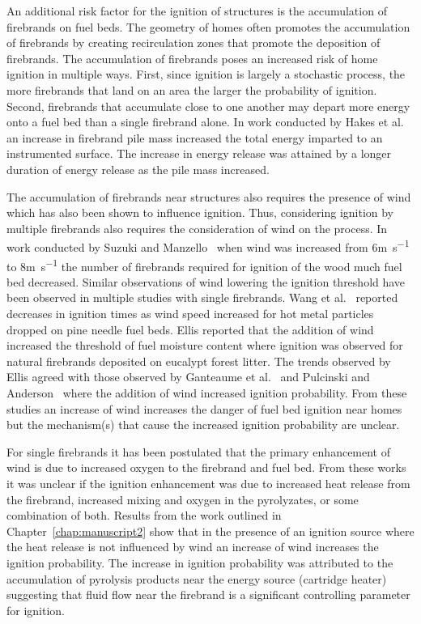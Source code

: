     An additional risk factor for the ignition of structures is the accumulation of firebrands on fuel beds. The geometry of homes often promotes the accumulation of firebrands by creating recirculation zones that promote the deposition of firebrands. The accumulation of firebrands poses an increased risk of home ignition in multiple ways. First, since ignition is largely a stochastic process, the more firebrands that land on an area the larger the probability of ignition. Second, firebrands that accumulate close to one another may depart more energy onto a fuel bed than a single firebrand alone. In work conducted by Hakes et al.~\cite{Hakes2019a} an increase in firebrand pile mass increased the total energy imparted to an instrumented surface. The increase in energy release was attained by a longer duration of energy release as the pile mass increased.
    
    The accumulation of firebrands near structures also requires the presence of wind which has also been shown to influence ignition. Thus, considering ignition by multiple firebrands also requires the consideration of wind on the process. In work conducted by Suzuki and Manzello~\cite{Suzuki2020a} when wind was increased from 6\si{\meter\per\second} to 8\si{\meter\per\second} the number of firebrands required for ignition of the wood much fuel bed decreased. Similar observations of wind lowering the ignition threshold have been observed in multiple studies with single firebrands. Wang et al.~\cite{Wang2017} reported decreases in ignition times as wind speed increased for hot metal particles dropped on pine needle fuel beds. Ellis reported that the addition of wind increased the threshold of fuel moisture content where ignition was observed for natural firebrands  deposited on eucalypt forest litter. The trends observed by Ellis agreed with those observed by Ganteaume et al.~\cite{Ganteaume2009} and Pulcinski and Anderson~\cite{Plucinski2008} where the addition of wind increased ignition probability. From these studies an increase of wind increases the danger of fuel bed ignition near homes but the mechanism(s) that cause the increased ignition probability are unclear. 
    
    For single firebrands it has been postulated that the primary enhancement of wind is due to increased oxygen to the firebrand and fuel bed. From these works it was unclear if the ignition enhancement was due to increased heat release from the firebrand, increased mixing and oxygen in the pyrolyzates, or some combination of both. Results from the work outlined in Chapter~\ref{chap:manuscript2} show that in the presence of an ignition source where the heat release is not influenced by wind an increase of wind increases the ignition probability. The increase in ignition probability was attributed to the accumulation of pyrolysis products near the energy source (cartridge heater) suggesting that fluid flow near the firebrand is a significant controlling parameter for ignition. 
    
